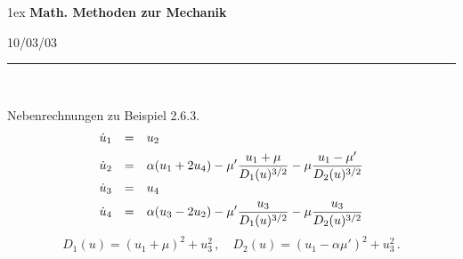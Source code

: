 \documentclass[12pt,a4paper,twoside,leqno]{article}
\newcommand{\Release}{10/03/03} %
\begin{document}
\addtolength{\belowdisplayshortskip}{-1ex}
\setlength{\fboxsep}{1ex}
\parskip1ex
%
{\bf Math. Methoden zur Mechanik}
\par\vspace{-1mm}
\hfill{\footnotesize\Release\ }
\par\vspace{-2mm}
\rule{\textwidth}{1pt}\\
\par\vspace{-3mm}
Nebenrechnungen zu Beispiel 2.6.3.
\[
\ba{.}{rcl}
\dot{u}_1 &=& u_2\\[1ex]
\dot{u}_2 &=& \dis \alpha(u_1 + 2u_4)
 - \mu'\frac{u_1 + \mu }{D_1(u)^{3/2}} - \mu \frac{u_1 - \mu'}{D_2(u)^{3/2}}\\[1ex]
\dot{u}_3 &=& u_4\\[1ex]
\dot{u}_4 &=& \dis \alpha(u_3 - 2u_2)
- \mu'\frac{u_3}{D_1(u)^{3/2}} - \mu\frac{u_3}{D_2(u)^{3/2}}
\ea{.}
\]
\[
D_1(u) = (u_1 + \mu )^2 + u^2_3\,, \quad
D_2(u) = (u_1 - \alpha \mu ')^2 + u^2_3\,.
\]
\end{document}
